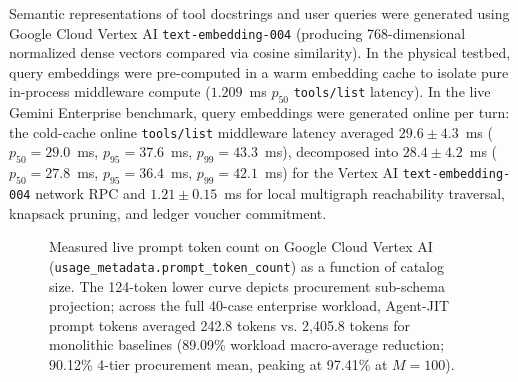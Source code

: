\documentclass[conference,10pt]{IEEEtran}
\begin{document}
Semantic representations of tool docstrings and user queries were generated using Google Cloud Vertex AI \texttt{text-embedding-004} (producing 768-dimensional normalized dense vectors compared via cosine similarity). In the physical testbed, query embeddings were pre-computed in a warm embedding cache to isolate pure in-process middleware compute ($1.209$~ms $p_{50}$ \texttt{tools/list} latency). In the live Gemini Enterprise benchmark, query embeddings were generated online per turn: the cold-cache online \texttt{tools/list} middleware latency averaged $29.6 \pm 4.3$~ms ($p_{50} = 29.0$~ms, $p_{95} = 37.6$~ms, $p_{99} = 43.3$~ms), decomposed into $28.4 \pm 4.2$~ms ($p_{50} = 27.8$~ms, $p_{95} = 36.4$~ms, $p_{99} = 42.1$~ms) for the Vertex AI \texttt{text-embedding-004} network RPC and $1.21 \pm 0.15$~ms for local multigraph reachability traversal, knapsack pruning, and ledger voucher commitment.

\begin{figure}[t]
\centering
{}
\caption{Measured live prompt token count on Google Cloud Vertex AI (\texttt{usage\_metadata.prompt\_token\_count}) as a function of catalog size. The 124-token lower curve depicts procurement sub-schema projection; across the full 40-case enterprise workload, Agent-JIT prompt tokens averaged 242.8 tokens vs. 2,405.8 tokens for monolithic baselines (89.09\% workload macro-average reduction; 90.12\% 4-tier procurement mean, peaking at 97.41\% at $M=100$).}
\label{fig:fig1}
\end{figure}
\end{document}
